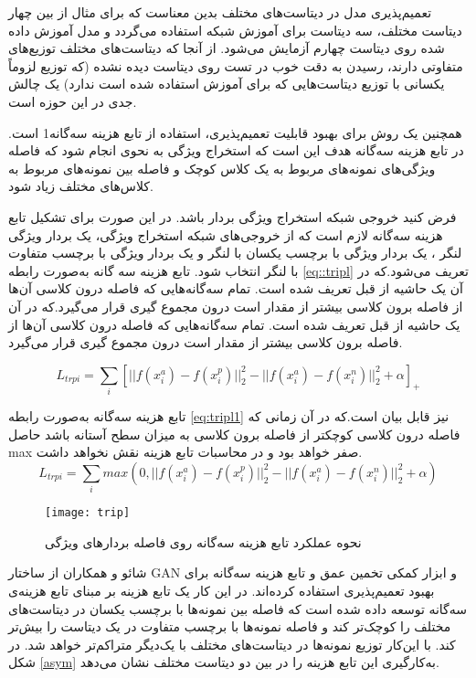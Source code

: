 تعمیم‌پذیری مدل در دیتاست‌های مختلف بدین معناست که برای مثال از بین چهار دیتاست مختلف، سه دیتاست برای آموزش شبکه استفاده می‌گردد و مدل آموزش داده شده روی دیتاست چهارم آزمایش می‌شود. از آنجا که دیتاست‌های مختلف توزیع‌های متفاوتی دارند، رسیدن به دقت خوب در تست روی دیتاست دیده نشده (که توزیع لزوماً یکسانی با توزیع دیتاست‌هایی که برای آموزش استفاده شده است ندارد) یک چالش جدی در این حوزه است. 

همچنین یک روش برای بهبود قابلیت تعمیم‌پذیری، استفاده از تابع هزینه سه‌گانه1 
\cite{schroff2015facenet}
است. در تابع هزینه سه‌گانه هدف این است که استخراج ویژگی به نحوی انجام شود که فاصله ویژگی‌های نمونه‌های مربوط به یک کلاس کوچک و فاصله بین نمونه‌های مربوط به کلاس‌های مختلف زیاد شود.

فرض کنید خروجی شبکه استخراج ویژگی بردار  باشد. در این صورت برای تشکیل تابع هزینه سه‌گانه لازم است که از خروجی‌های شبکه استخراج ویژگی، یک بردار ویژگی لنگر ، یک بردار ویژگی با برچسب یکسان با لنگر  و یک بردار ویژگی با برچسب متفاوت با لنگر   انتخاب شود. تابع هزینه سه گانه به‌صورت رابطه
\ref{eq::tripl}
 تعریف می‌شود.که در آن  یک حاشیه از قبل تعریف شده است. تمام سه‌گانه‌هایی که فاصله درون کلاسی آن‌ها از فاصله برون کلاسی بیشتر از مقدار  است درون مجموع گیری قرار می‌گیرد.که در آن  یک حاشیه از قبل تعریف شده است. تمام سه‌گانه‌هایی که فاصله درون کلاسی آن‌ها از فاصله برون کلاسی بیشتر از مقدار  است درون مجموع گیری قرار می‌گیرد.
 
 \begin{equation}\label{eq:tripl}
L_{trpi} = \sum_{i}{[||f(x_i^a)-f(x_i^p)||_2^2-||f(x_i^a)-f(x_i^n)||_2^2+\alpha]_+}
 \end{equation}

تابع هزینه سه‌گانه به‌صورت رابطه
\ref{eq:tripl1}
نیز قابل بیان است.که در آن زمانی که فاصله درون کلاسی کوچکتر از فاصله برون کلاسی به میزان سطح آستانه  باشد حاصل max صفر خواهد بود و در محاسبات تابع هزینه نقش نخواهد داشت.
 \begin{equation}\label{eq:tripl1}
	L_{trpi} = \sum_{i}{max(0,||f(x_i^a)-f(x_i^p)||_2^2-||f(x_i^a)-f(x_i^n)||_2^2+\alpha)}
\end{equation}

\begin{figure}[t]
	\centerline{\texttt{[image: trip]}}
	\caption{نحوه عملکرد تابع هزینه سه‌گانه روی فاصله بردارهای ویژگی \cite{schroff2015facenet} }
	\label{fig:trip}
\end{figure}
شائو و همکاران
\cite{shao2019multi}
از ساختار GAN و ابزار کمکی تخمین عمق و تابع هزینه سه‌گانه برای بهبود تعمیم‌پذیری استفاده کرده‌اند. در این کار یک تابع هزینه بر مبنای تابع هزینه‌ی سه‌گانه توسعه داده شده است که فاصله بین نمونه‌ها با برچسب یکسان در دیتاست‌های مختلف را کوچک‌تر کند و فاصله نمونه‌ها با برچسب متفاوت در یک دیتاست را بیش‌تر کند. با این‌کار توزیع نمونه‌ها در دیتاست‌های مختلف با یک‌دیگر متراکم‌تر خواهد شد. در شکل
\ref{asym} 
به‌کارگیری این تابع هزینه را در بین دو دیتاست مختلف نشان می‌دهد.

